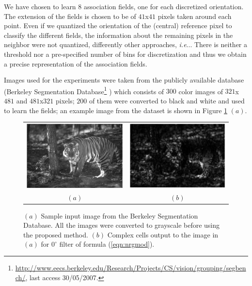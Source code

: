 \documentclass{llncs}
\makeatletter
\DeclareRobustCommand\onedot{\futurelet\@let@token\@onedot}
\def\@onedot{\ifx\@let@token.\else.\null\fi\xspace}
\def\ie{\emph{i.e}\onedot} \def\Ie{\emph{I.e}\onedot}
\makeatother
\begin{document}
We have chosen to learn $8$ association fields, one for each discretized
orientation. The extension of the fields is chosen to be of $41$x$41$ pixels
taken around each point.
Even if we quantized the orientation of the (central)
reference pixel to classify the different fields, the information about the remaining
pixels in the neighbor were not quantized, differently other approaches, \ie \cite{Sigman01}.
There is neither a threshold nor a pre-specified number of bins for
discretization and thus we obtain a precise representation of the association fields.

Images used for the experiments were taken from the
publicly available database (Berkeley Segmentation
Database\footnote{\url{http://www.eecs.berkeley.edu/Research/Projects/CS/vision/grouping/segbench/}, last access 30/05/2007.}
\cite{MartinFTM01}) which consists of $300$
color images of $321$x$481$ and $481$x$321$ pixels;
$200$ of them were converted to black and white and used
to learn the fields; an
example image from the dataset is shown in Figure \ref{fig:exampleimg} $(a)$.


\begin{figure}[]
	\begin{center}
		\begin{tabular}{cc}
			\includegraphics[width=0.4\linewidth]{./figs/af/esempio} &
			\includegraphics[width=0.4\linewidth]{./figs/af/esempio_fil} \\
			$(a)$ & $(b)$
		\end{tabular}
    \caption{$(a)$ Sample input image from the Berkeley Segmentation Database.
     All the images were converted to grayscale before using the proposed method.
     $(b)$ Complex cells output to the image in $(a)$ for $0^\circ$ filter of formula (\ref{eqn:nrgmod}).}
    \label{fig:exampleimg}
	\end{center}
\end{figure}
\end{document}
